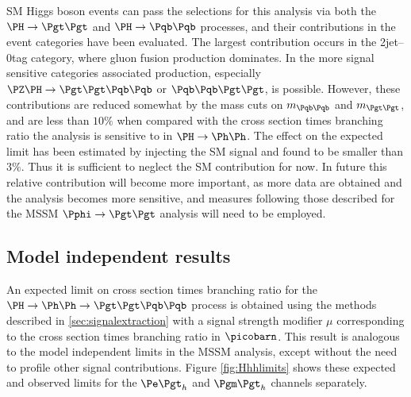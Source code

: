 \ac{SM} Higgs boson events can pass the selections for this analysis via both the $\PH\to\Pgt\Pgt$
and $\PH\to\Pqb\Pqb$ processes, and their contributions in the event
categories have been evaluated. The largest contribution occurs in the
2jet--0tag category, where gluon fusion production dominates. In the more signal
sensitive categories associated production, especially
$\PZ\PH\to\Pgt\Pgt\Pqb\Pqb$ or $\Pqb\Pqb\Pgt\Pgt$, is possible. 
However, these contributions are
reduced somewhat by the mass cuts on $m_{\Pqb\Pqb}$ and $m_{\Pgt\Pgt}$, and 
are less than $10\%$ when compared with the cross section times branching ratio
the analysis is sensitive to in $\PH\to\Ph\Ph$. The effect on the expected limit
has been estimated by injecting the \ac{SM} signal and found to be smaller than
$3\%$. Thus it is sufficient to neglect the \ac{SM} contribution for now. In
future this relative contribution will become more important, as more data are
obtained and the analysis becomes more sensitive, and measures following those
described for the \ac{MSSM} $\Pphi\to\Pgt\Pgt$ analysis will need to be
employed. 

\subsection{Model independent results}

An expected limit on cross section times branching ratio for the $\Hhh$
process is obtained using the methods described in \ref{sec:signalextraction}
with a signal strength modifier $\mu$ corresponding to the cross section times
branching ratio in $\picobarn$. This result is analogous to the model independent
limits in the \ac{MSSM} analysis, except without the need to profile other
signal contributions. Figure \ref{fig:Hhhlimits} shows these
expected and observed limits for the $\etau$ and $\mutau$ channels separately.


